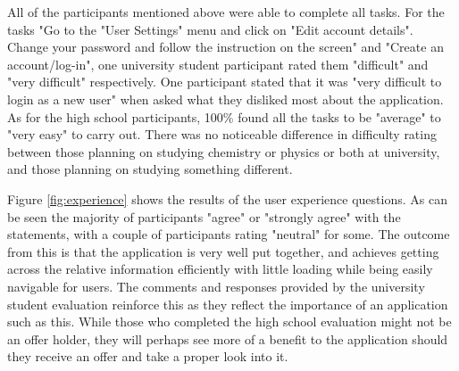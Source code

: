 \documentclass{l4proj}
\begin{document}
All of the participants mentioned above were able to complete all tasks. For the tasks "Go to the "User Settings" menu and click on "Edit account details". Change your password and follow the instruction on the screen" and "Create an account/log-in",  one university student participant rated them "difficult" and "very difficult" respectively. One participant stated that it was "very difficult to login as a new user" when asked what they disliked most about the application. As for the high school participants, 100\% found all the tasks to be "average" to "very easy" to carry out. There was no noticeable difference in difficulty rating between those planning on studying chemistry or physics or both at university, and those planning on studying something different.

Figure \ref{fig:experience} shows the results of the user experience questions. As can be seen the majority of participants "agree" or "strongly agree" with the statements,  with a couple of participants rating "neutral" for some. The outcome from this is that the application is very well put together,  and achieves getting across the relative information efficiently with little loading while being easily navigable for users. The comments and responses provided by the university student evaluation reinforce this as they reflect the importance of an application such as this. While those who completed the high school evaluation might not be an offer holder, they will perhaps see more of a benefit to the application should they receive an offer and take a proper look into it.
\end{document}
